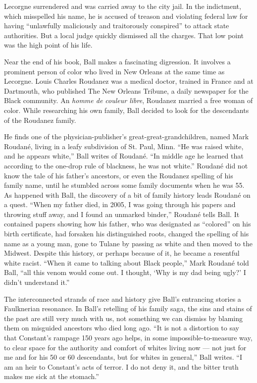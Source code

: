 Lecorgne surrendered and was carried away to the city jail. In the
indictment, which misspelled his name, he is accused of treason and
violating federal law for having ``unlawfully maliciously and
traitorously conspired'' to attack state authorities. But a local judge
quickly dismissed all the charges. That low point was the high point of
his life.

Near the end of his book, Ball makes a fascinating digression. It
involves a prominent person of color who lived in New Orleans at the
same time as Lecorgne. Louis Charles Roudanez was a medical doctor,
trained in France and at Dartmouth, who published The New Orleans
Tribune, a daily newspaper for the Black community. An \emph{homme de
couleur libre}, Roudanez married a free woman of color. While
researching his own family, Ball decided to look for the descendants of
the Roudanez family.

He finds one of the physician-publisher's great-great-grandchildren,
named Mark Roudané, living in a leafy subdivision of St. Paul, Minn.
``He was raised white, and he appears white,'' Ball writes of Roudané.
``In middle age he learned that according to the one-drop rule of
blackness, he was not white.'' Roudané did not know the tale of his
father's ancestors, or even the Roudanez spelling of his family name,
until he stumbled across some family documents when he was 55. As
happened with Ball, the discovery of a bit of family history leads
Roudané on a quest. ``When my father died, in 2005, I was going through
his papers and throwing stuff away, and I found an unmarked binder,''
Roudané tells Ball. It contained papers showing how his father, who was
designated as ``colored'' on his birth certificate, had forsaken his
distinguished roots, changed the spelling of his name as a young man,
gone to Tulane by passing as white and then moved to the Midwest.
Despite this history, or perhaps because of it, he became a resentful
white racist. ``When it came to talking about Black people,'' Mark
Roudané told Ball, ``all this venom would come out. I thought, `Why is
my dad being ugly?' I didn't understand it.''

The interconnected strands of race and history give Ball's entrancing
stories a Faulknerian resonance. In Ball's retelling of his family saga,
the sins and stains of the past are still very much with us, not
something we can dismiss by blaming them on misguided ancestors who died
long ago. ``It is not a distortion to say that Constant's rampage 150
years ago helps, in some impossible-to-measure way, to clear space for
the authority and comfort of whites living now --- not just for me and
for his 50 or 60 descendants, but for whites in general,'' Ball writes.
``I am an heir to Constant's acts of terror. I do not deny it, and the
bitter truth makes me sick at the stomach.''

